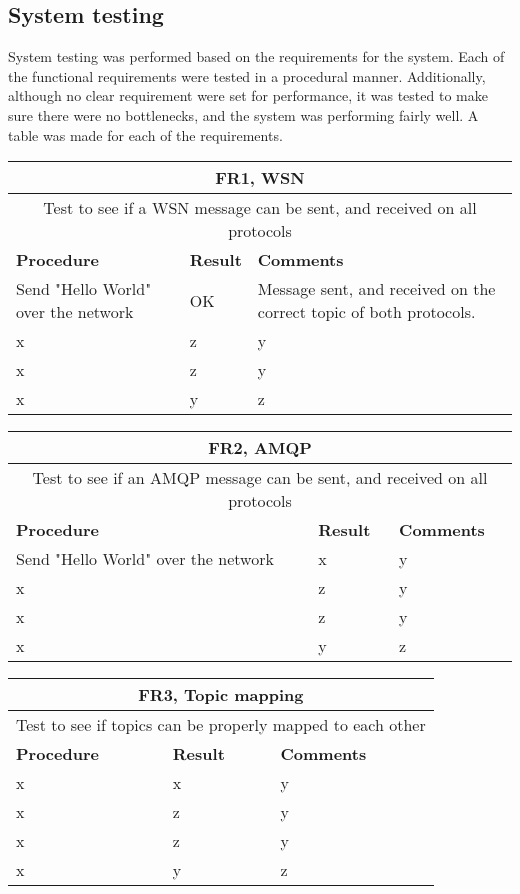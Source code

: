 \subsection{System testing}

System testing was performed based on the requirements for the system. Each of the functional requirements were tested in a procedural manner. Additionally, although no clear requirement were set for performance, it was tested to make sure there were no bottlenecks, and the system was performing fairly well. A table was made for each of the requirements.

\begin{table}[ht!]
\begin{tabular}{|m{4cm}|m{2cm}|m{4cm}|}
\hline
\multicolumn{3}{|c|}{\textbf{FR1, WSN}} \\ \hline
\multicolumn{3}{|c|}{{Test to see if a WSN message can be sent, and received on all protocols}} \\ \hline
\textbf{Procedure} & \textbf{Result} & \textbf{Comments} \\ \hline
Send "Hello World" over the network & OK & Message sent, and received on the correct topic of both protocols. \\ \hline
x&z&y \\ \hline
x&z&y \\ \hline
x&y&z \\ \hline
\end{tabular}
\end{table}

\begin{table}[ht!]
\begin{tabular}{|m{4cm}|m{2cm}|m{4cm}|}
\hline
\multicolumn{3}{|c|}{\textbf{FR2, AMQP}} \\ \hline
\multicolumn{3}{|c|}{{Test to see if an AMQP message can be sent, and received on all protocols}} \\ \hline
\textbf{Procedure} & \textbf{Result} & \textbf{Comments} \\ \hline
Send "Hello World" over the network & x & y \\ \hline
x&z&y \\ \hline
x&z&y \\ \hline
x&y&z \\ \hline
\end{tabular}
\end{table}

\begin{table}[ht!]
\begin{tabular}{|m{4cm}|m{2cm}|m{4cm}|}
\hline
\multicolumn{3}{|c|}{\textbf{FR3, Topic mapping}} \\ \hline
\multicolumn{3}{|c|}{{Test to see if topics can be properly mapped to each other}} \\ \hline
\textbf{Procedure} & \textbf{Result} & \textbf{Comments} \\ \hline
x & x & y \\ \hline
x &z&y \\ \hline
x &z&y \\ \hline
x&y&z \\ \hline
\end{tabular}
\end{table}

